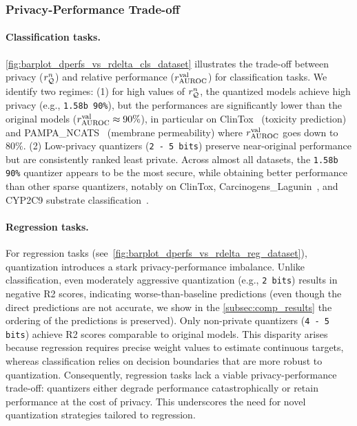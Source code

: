 \subsubsection{Privacy-Performance Trade-off}
\label{ssec:tradeoff}

\paragraph{Classification tasks.}
\autoref{fig:barplot_dperfs_vs_rdelta_cls_dataset} illustrates the trade-off between privacy ($r_{{\mathcal{Q}}}^n$) and relative performance ($r^{\textrm{val}}_{\textrm{AUROC}}$) for classification tasks.
We identify two regimes: (1) for high values of $r_{{\mathcal{Q}}}^n$, the quantized models achieve high privacy (e.g., \texttt{1.58b 90\%}), but the performances are significantly lower than the original models ($r^{\textrm{val}}_{\textrm{AUROC}} \approx 90\%$), in particular on ClinTox~\cite{CLINTOX} (toxicity prediction) and PAMPA\_NCATS~\cite{PAMPA} (membrane permeability) where $r^{\textrm{val}}_{\textrm{AUROC}}$ goes down to $80\%$.
(2) Low-privacy quantizers (\texttt{2 - 5 bits}) preserve near-original performance but are consistently ranked least private.
Across almost all datasets, the \texttt{1.58b 90\%} quantizer appears to be the most secure, while obtaining better performance than other sparse quantizers, notably on ClinTox, Carcinogens\_Lagunin~\cite{CARCINOGENS}, and CYP2C9 substrate classification~\cite{CYP_CARB}.


\paragraph{Regression tasks.}
For regression tasks (see~\autoref{fig:barplot_dperfs_vs_rdelta_reg_dataset}), quantization introduces a stark privacy-performance imbalance.
Unlike classification, even moderately aggressive quantization (e.g., \texttt{2 bits}) results in negative R2 scores, indicating worse-than-baseline predictions (even though the direct predictions are not accurate, we show in the \autoref{subsec:comp_results} the ordering of the predictions is preserved).
Only non-private quantizers (\texttt{4 - 5 bits}) achieve R2 scores comparable to original models.
This disparity arises because regression requires precise weight values to estimate continuous targets, whereas classification relies on decision boundaries that are more robust to quantization.
Consequently, regression tasks lack a viable privacy-performance trade-off: quantizers either degrade performance catastrophically or retain performance at the cost of privacy.
This underscores the need for novel quantization strategies tailored to regression.
